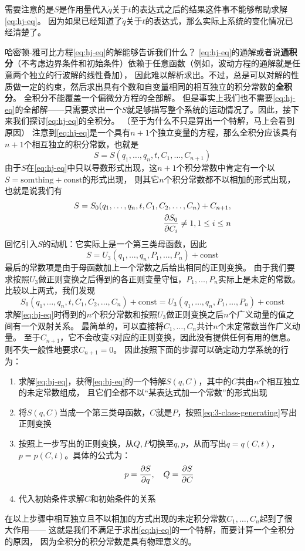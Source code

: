\documentclass[UTF8, a4paper]{ctexart}
\newcommand*{\const}{\mathrm{const}}
\begin{document}
需要注意的是$S$是作用量代入$\dot{q}$关于$t$的表达式之后的结果这件事不能够帮助求解\eqref{eq:hj-eq}。
因为如果已经知道了$\dot{q}$关于$t$的表达式，那么实际上系统的变化情况已经清楚了。

哈密顿-雅可比方程\eqref{eq:hj-eq}的解能够告诉我们什么？
\eqref{eq:hj-eq}的通解或者说\textbf{通积分}（不考虑边界条件和初始条件）依赖于任意函数（例如，波动方程的通解就是任意两个独立的行波解的线性叠加），
因此难以解析求出。不过，总是可以对解的性质做一定的约束，然后求出具有个数和自变量相同的相互独立的积分常数的\textbf{全积分}。
全积分不能覆盖一个偏微分方程的全部解。
但是事实上我们也不需要\eqref{eq:hj-eq}的全部解——只需要求出一个$S$就足够描写整个系统的运动情况了。因此，接下来我们探讨\eqref{eq:hj-eq}的全积分。
（至于为什么不只是算出一个特解，马上会看到原因）
注意到\eqref{eq:hj-eq}是一个具有$n+1$个独立变量的方程，那么全积分应该具有$n+1$个相互独立的积分常数，也就是
\[
    S = S(q_1, \ldots, q_n, t, C_1, \ldots, C_{n+1})
\]
由于$S$在\eqref{eq:hj-eq}中只以导数形式出现，这$n+1$个积分常数中肯定有一个以$S = \text{somthing} + \const$的形式出现，
则其它$n$个积分常数都不以相加的形式出现，也就是说我们有
\[
    \begin{split}
        S = S_0 (q_1, \ldots, q_n, t, C_1, C_2, \ldots, C_n) + C_{n+1}, \\
        \pdv{S_0}{C_i} \neq 1, 1 \leq i \leq n
    \end{split}
\]
回忆引入$S$的动机：它实际上是一个第三类母函数，因此
\[
    S  = U_3(q_1, \ldots, q_n, P_1, \ldots, P_n) + \const
\]
最后的常数项是由于母函数加上一个常数之后给出相同的正则变换。
由于我们要求按照$U_3$做正则变换之后得到的各正则变量守恒，$P_1, \ldots, P_n$实际上是未定的常数。
比较以上两式，我们发现
\[
    S_0(q_1, \ldots, q_n, t, C_1, C_2, \ldots, C_n) + \const = U_3(q_1, \ldots, q_n, P_1, \ldots, P_n) + \const
\]
求解\eqref{eq:hj-eq}时得到的$n$个积分常数和按照$U_3$做正则变换之后$n$个广义动量的值之间有一个双射关系。
最简单的，可以直接将$C_1, \ldots, C_n$共计$n$个未定常数当作广义动量。
至于$C_{n+1}$，它不会改变$S$对应的正则变换，因此没有提供任何有用的信息。则不失一般性地要求$C_{n+1}=0$。
因此按照下面的步骤可以确定动力学系统的行为：
\begin{enumerate}
    \item 求解\eqref{eq:hj-eq}，获得\eqref{eq:hj-eq}的一个特解$S(q, C)$，其中的$C$共由$n$个相互独立的未定常数组成，
    且它们全都不以“某表达式加一个常数”的形式出现
    \item 将$S(q, C)$当成一个第三类母函数，$C$就是$P$，按照\eqref{eq:3-class-generating}写出正则变换
    \item 按照上一步写出的正则变换，从$Q, P$切换至$q, p$，从而写出$q=q(C, t)$，$p=p(C, t)$。具体的公式为：
    \begin{equation}
        p = \pdv{S}{q}, \quad Q = \pdv{S}{C}
        \label{eq:from-sc-to-pq}
    \end{equation}
    \item 代入初始条件求解$C$和初始条件的关系
\end{enumerate}
在以上步骤中相互独立且不以相加的方式出现的未定积分常数$C_1, \ldots, C_n$起到了很大作用——
这就是我们不满足于求出\eqref{eq:hj-eq}的一个特解，而要计算一个全积分的原因，
因为全积分的积分常数是具有物理意义的。
\end{document}

